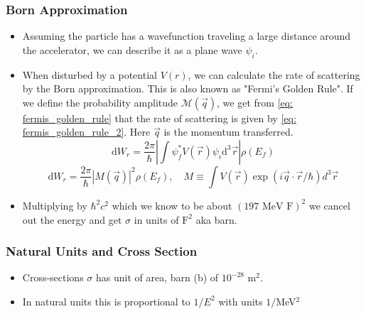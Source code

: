 \subsubsection{Born Approximation}
\begin{itemize}
    \item Assuming the particle has a wavefunction traveling a large distance around the accelerator, we can describe it as a plane wave $ψ_i$. 
    \item When disturbed by a potential $V(r)$, we can calculate the rate of scattering by the Born approximation. This is also known as "Fermi's Golden Rule". If we define the probability amplitude $\mathcal{M}(\vec{q})$, we get from \cref{eq: fermis_golden_rule} that the rate of scattering is given by \cref{eq: fermis_golden_rule_2}. Here $\vec{q}$ is the momentum transferred. 
    \begin{equation}\label{eq: fermis_golden_rule}
      \mathrm{d}W_r = \frac{2π}{ℏ} \left|∫ ψ_f^{*}V(\vec{r})ψ_i \mathrm{d}^3 \vec{r}\right| ρ(E_f) 
    \end{equation}
    \begin{equation}\label{eq: fermis_golden_rule_2}
      \mathrm{d}W_r = \frac{2π}{ℏ} \left|M(\vec{q})\right|^2 ρ(E_f), \quad M ≡ ∫ V(\vec{r})\exp \left(i \vec{q} ⋅ \vec{r} / ℏ\right)d^3 \vec{r}
    \end{equation}
    \item Multiplying by $ℏ^2c^2$ which we know to be about $(197 \text{ MeV F})^2$ we cancel out the energy and get $σ$ in units of $\text{F}^2$ aka barn. 
\end{itemize}

\subsubsection{Natural Units and Cross Section}
\begin{itemize}
    \item Cross-sections $σ$ has unit of area, barn (b) of $10^{-28}$ m$^2$. 
    \item In natural units this is proportional to $1 / E^2$ with units $1 / $MeV$^2$
\end{itemize}

